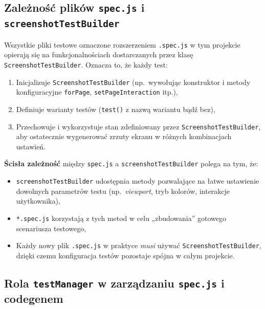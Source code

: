 \documentclass[12pt]{report}
\begin{document}
\subsection{Zależność plików \texttt{spec.js} i \texttt{screenshotTestBuilder}}
\label{sec:zaleznosc-spec-builder}

Wszystkie pliki testowe oznaczone rozszerzeniem \texttt{.spec.js} w tym projekcie opierają się na funkcjonalnościach dostarczanych przez klasę \texttt{ScreenshotTestBuilder}. Oznacza to, że każdy test:
\begin{enumerate}
   \item Inicjalizuje \texttt{ScreenshotTestBuilder} (np.~wywołując konstruktor i metody konfiguracyjne \texttt{forPage}, \texttt{setPageInteraction} itp.),
   \item Definiuje warianty testów (\texttt{test()} z nazwą wariantu bądź bez),
   \item Przechowuje i wykorzystuje stan zdefiniowany przez \texttt{ScreenshotTestBuilder}, aby ostatecznie wygenerować zrzuty ekranu w różnych kombinacjach ustawień.
\end{enumerate}

\noindent \textbf{Ścisła zależność} między \texttt{spec.js} a \texttt{screenshotTestBuilder} polega na tym, że:
\begin{itemize}
   \item \texttt{screenshotTestBuilder} udostępnia metody pozwalające na łatwe ustawienie dowolnych parametrów testu (np.~\emph{viewport}, tryb kolorów, interakcje użytkownika),
   \item \texttt{*.spec.js} korzystają z tych metod w celu „zbudowania” gotowego scenariusza testowego,
   \item Każdy nowy plik \texttt{.spec.js} w praktyce \emph{musi} używać \texttt{ScreenshotTestBuilder}, dzięki czemu konfiguracja testów pozostaje spójna w całym projekcie.
\end{itemize}

\subsection{Rola \texttt{testManager} w zarządzaniu \texttt{spec.js} i codegenem}
\label{sec:rola-testManager}
\end{document}
